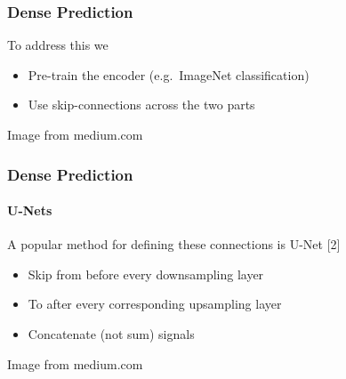 \documentclass[xetex,professionalfont]{beamer}
\renewcommand\emph[1]{\textcolor{tuwcvl_cvl_blue}{#1}}
\begin{document}
\begin{frame}
	\frametitle{Dense Prediction}

	To address this we
	\begin{itemize}
		\item Pre-train the encoder (e.g.~ImageNet classification)
		\item Use skip-connections across the two parts
	\end{itemize}

	\bigskip

	\begin{center}
		{\centering Image from medium.com}
	\end{center}

\end{frame}


\begin{frame}
	\frametitle{Dense Prediction}
	\framesubtitle{U-Nets}

	A popular method for defining these connections is \emph{U-Net} [2]
	\begin{itemize}
		\item Skip from before every downsampling layer
		\item To after every corresponding upsampling layer
		\item \emph{Concatenate} (not sum) signals
	\end{itemize}

	\bigskip

	\begin{center}
		{\centering Image from medium.com}
	\end{center}

\end{frame}
\end{document}
